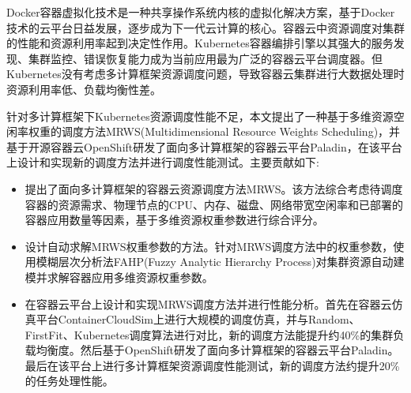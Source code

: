 \begin{cabstract}
  Docker容器虚拟化技术是一种共享操作系统内核的虚拟化解决方案，基于Docker技术的云平台日益发展，逐步成为下一代云计算的核心。容器云中资源调度对集群的性能和资源利用率起到决定性作用。Kubernetes容器编排引擎以其强大的服务发现、集群监控、错误恢复能力成为当前应用最为广泛的容器云平台调度器。但Kubernetes没有考虑多计算框架资源调度问题，导致容器云集群进行大数据处理时资源利用率低、负载均衡性差。
  
  针对多计算框架下Kubernetes资源调度性能不足，本文提出了一种基于多维资源空闲率权重的调度方法MRWS(Multidimensional Resource Weights Scheduling)，并基于开源容器云OpenShift研发了面向多计算框架的容器云平台Paladin，在该平台上设计和实现新的调度方法并进行调度性能测试。主要贡献如下:
  \begin{itemize}
  	\item 提出了面向多计算框架的容器云资源调度方法MRWS。该方法综合考虑待调度容器的资源需求、物理节点的CPU、内存、磁盘、网络带宽空闲率和已部署的容器应用数量等因素，基于多维资源权重参数进行综合评分。
  	\item 设计自动求解MRWS权重参数的方法。针对MRWS调度方法中的权重参数，使用模糊层次分析法FAHP(Fuzzy Analytic Hierarchy Process)对集群资源自动建模并求解容器应用多维资源权重参数。
  	\item 在容器云平台上设计和实现MRWS调度方法并进行性能分析。首先在容器云仿真平台ContainerCloudSim上进行大规模的调度仿真，并与Random、FirstFit、Kubernetes调度算法进行对比，新的调度方法能提升约40\%的集群负载均衡度。然后基于OpenShift研发了面向多计算框架的容器云平台Paladin。最后在该平台上进行多计算框架资源调度性能测试，新的调度方法约提升20\%的任务处理性能。
  \end{itemize}
\end{cabstract}


